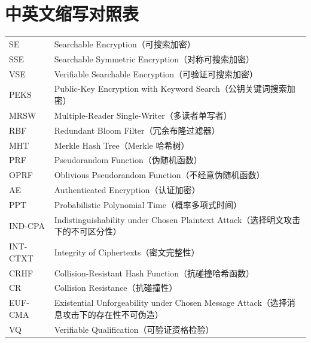 \chapter{中英文缩写对照表}\label{app:abbr-list}

\begingroup
\begin{center}
\begin{tabularx}{0.92\textwidth}{@{}p{}X@{}}
SE & Searchable Encryption（可搜索加密）\\
SSE & Searchable Symmetric Encryption（对称可搜索加密）\\
VSE & Verifiable Searchable Encryption（可验证可搜索加密）\\
PEKS & Public-Key Encryption with Keyword Search（公钥关键词搜索加密）\\
MRSW & Multiple-Reader Single-Writer（多读者单写者）\\
RBF & Redundant Bloom Filter（冗余布隆过滤器）\\
MHT & Merkle Hash Tree（Merkle 哈希树）\\
PRF & Pseudorandom Function（伪随机函数）\\
OPRF & Oblivious Pseudorandom Function（不经意伪随机函数）\\
AE & Authenticated Encryption（认证加密）\\
PPT & Probabilistic Polynomial Time（概率多项式时间）\\
IND-CPA & Indistinguishability under Chosen Plaintext Attack（选择明文攻击下的不可区分性）\\
INT-CTXT & Integrity of Ciphertexts（密文完整性）\\
CRHF & Collision-Resistant Hash Function（抗碰撞哈希函数）\\
CR & Collision Resistance（抗碰撞性）\\
EUF-CMA & Existential Unforgeability under Chosen Message Attack（选择消息攻击下的存在性不可伪造）\\
VQ & Verifiable Qualification（可验证资格检验）\\
\end{tabularx}
\end{center}
\endgroup

